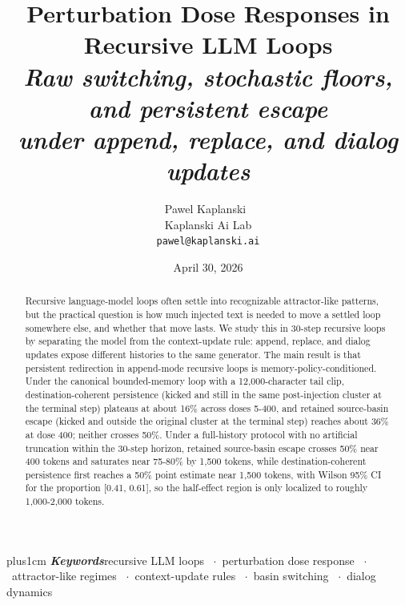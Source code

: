 \documentclass{article}
\title{Perturbation Dose Responses in Recursive LLM Loops\\[2pt]
       \large\itshape Raw switching, stochastic floors, and persistent escape\\
       \large\itshape under append, replace, and dialog updates}
\author{Pawel Kaplanski~\orcidlink{0000-0003-2223-0870}\\{}Kaplanski Ai Lab\\\texttt{pawel@kaplanski.ai}}
\date{April 30, 2026}
\providecommand{\keywords}[1]{%
  \par\addvspace\medskipamount
  {\rightskip=0pt plus1cm%
   \def\and{\ifhmode\unskip\nobreak\fi\ \ensuremath{\cdot}\ }%
   \noindent\textbf{\textit{Keywords}}\enspace\ignorespaces#1\par}%
}
\theoremstyle{plain}
\theoremstyle{definition}
\begin{document}
\maketitle

\keywords{recursive LLM loops \and perturbation dose response
  \and attractor-like regimes \and context-update rules
  \and basin switching \and dialog dynamics}

\begin{abstract}
Recursive language-model loops often settle into recognizable attractor-like patterns, but the practical question is how much injected text is needed to move a settled loop somewhere else, and whether that move lasts. We study this in 30-step recursive loops by separating the model from the context-update rule: append, replace, and dialog updates expose different histories to the same generator. The main result is that persistent redirection in append-mode recursive loops is memory-policy-conditioned. Under the canonical bounded-memory loop with a 12,000-character tail clip, destination-coherent persistence (kicked and still in the same post-injection cluster at the terminal step) plateaus at about 16\% across doses 5-400, and retained source-basin escape (kicked and outside the original cluster at the terminal step) reaches about 36\% at dose 400; neither crosses 50\%. Under a full-history protocol with no artificial truncation within the 30-step horizon, retained source-basin escape crosses 50\% near 400 tokens and saturates near 75-80\% by 1,500 tokens, while destination-coherent persistence first reaches a 50\% point estimate near 1,500 tokens, with Wilson 95\% CI for the proportion [0.41, 0.61], so the half-effect region is only localized to roughly 1,000-2,000 tokens.


\end{abstract}
\end{document}
